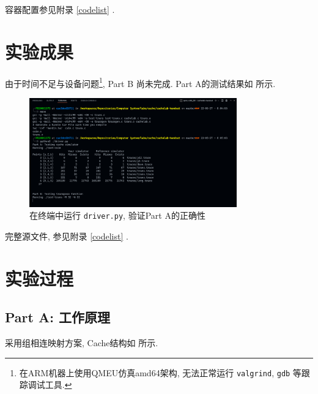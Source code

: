 容器配置参见附录 \ref{codelist} .

\clearpage
\section{实验成果}
由于时间不足与设备问题\footnote{在ARM机器上使用QMEU仿真amd64架构, 无法正常运行 \texttt{valgrind}, \texttt{gdb} 等跟踪调试工具.}, Part B 尚未完成.
Part A的测试结果如 所示.

\begin{figure}[H]
    \centering
    \includegraphics[width=0.8\textwidth]{result.png}
    \caption{在终端中运行 \texttt{driver.py}, 验证Part A的正确性}\label{result}
\end{figure}

完整源文件, 参见附录 \ref{codelist} .

\section{实验过程}

\subsection{Part A: 工作原理}\label{principle}

采用组相连映射方案, Cache结构如 所示. 

